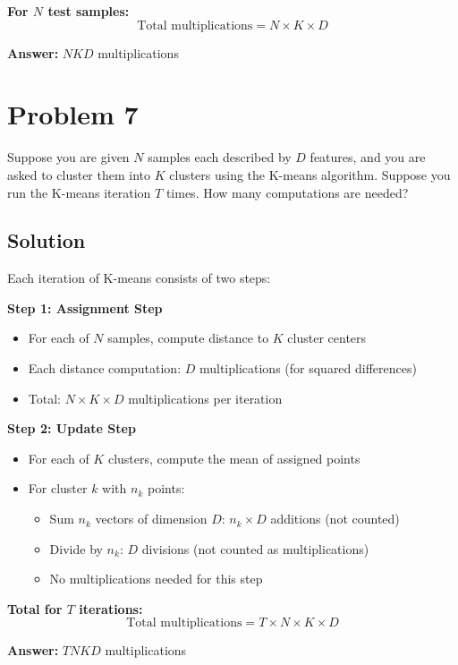 \documentclass[11pt]{article}
\begin{document}
\textbf{For $N$ test samples:}
\[
\text{Total multiplications} = N \times K \times D
\]

\textbf{Answer:} $NKD$ multiplications

\newpage

\section*{Problem 7}

Suppose you are given $N$ samples each described by $D$ features, and you are asked to cluster them into $K$ clusters using the K-means algorithm. Suppose you run the K-means iteration $T$ times. How many computations are needed?

\subsection*{Solution}

Each iteration of K-means consists of two steps:

\textbf{Step 1: Assignment Step}
\begin{itemize}
\item For each of $N$ samples, compute distance to $K$ cluster centers
\item Each distance computation: $D$ multiplications (for squared differences)
\item Total: $N \times K \times D$ multiplications per iteration
\end{itemize}

\textbf{Step 2: Update Step}
\begin{itemize}
\item For each of $K$ clusters, compute the mean of assigned points
\item For cluster $k$ with $n_k$ points:
  \begin{itemize}
  \item Sum $n_k$ vectors of dimension $D$: $n_k \times D$ additions (not counted)
  \item Divide by $n_k$: $D$ divisions (not counted as multiplications)
  \item No multiplications needed for this step
  \end{itemize}
\end{itemize}

\textbf{Total for $T$ iterations:}
\[
\text{Total multiplications} = T \times N \times K \times D
\]

\textbf{Answer:} $TNKD$ multiplications
\end{document}
